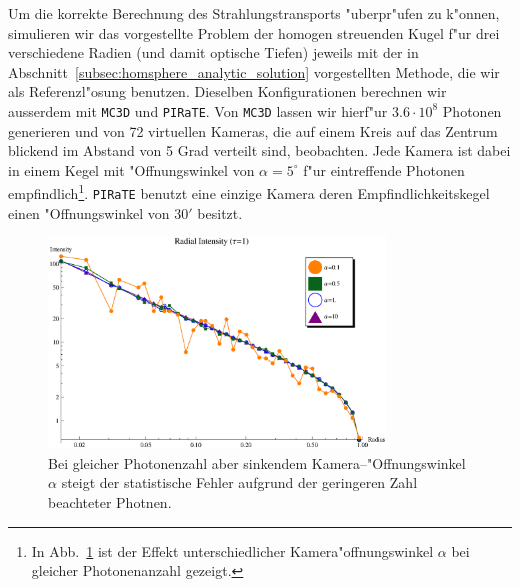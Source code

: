 	Um die korrekte Berechnung des Strahlungstransports "uberpr"ufen zu k"onnen, simulieren wir das vorgestellte Problem der homogen streuenden Kugel f"ur drei verschiedene Radien (und damit optische Tiefen) jeweils mit der in Abschnitt~\ref{subsec:homsphere_analytic_solution} vorgestellten Methode, die wir als Referenzl"osung benutzen. Dieselben Konfigurationen berechnen wir ausserdem mit \texttt{MC3D} und \texttt{PIRaTE}. Von \texttt{MC3D} lassen wir hierf"ur $3.6\cdot10^8$ Photonen generieren und von 72 virtuellen Kameras, die auf einem Kreis auf das Zentrum blickend im Abstand von 5 Grad verteilt sind, beobachten. Jede Kamera ist dabei in einem Kegel mit "Offnungswinkel von $\alpha=5^\circ$ f"ur eintreffende Photonen empfindlich\footnote{In Abb.~\ref{fig:alphacomparison} ist der Effekt unterschiedlicher Kamera"offnungswinkel $\alpha$ bei gleicher Photonenanzahl gezeigt.}. \texttt{PIRaTE} benutzt eine einzige Kamera deren Empfindlichkeitskegel einen "Offnungswinkel von $30'$ besitzt.
	
		\begin{figure}
			\centering
			\includegraphics[width=0.8\textwidth]{mc3dalphasplot.eps}
			\caption{Bei gleicher Photonenzahl aber sinkendem Kamera--"Offnungswinkel $\alpha$ steigt der statistische Fehler aufgrund der geringeren Zahl beachteter Photnen.}
			\label{fig:alphacomparison}
		\end{figure}
	
